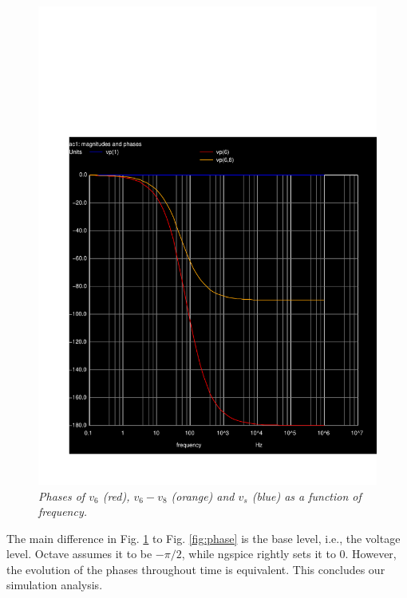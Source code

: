 \vspace{-13mm}
\begin{figure}[H]
    \centering
    \includegraphics[width = 0.85\linewidth]{../sim/zezoca.pdf}
        \caption{\textit{Phases of $v_6$ (red), $v_6 - v_8$ (orange) and $v_s$ (blue) as a function of frequency.}}
    \label{fig:ngspice_phase}
\end{figure}

The main difference in Fig. \ref{fig:ngspice_phase} to Fig. \ref{fig:phase} is the base level, i.e., the voltage level. Octave assumes it to be $-\pi/2$, while ngspice rightly sets it to 0. However, the evolution of the phases throughout time is equivalent. This concludes our simulation analysis.